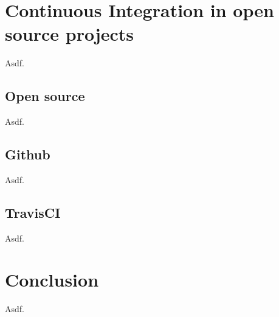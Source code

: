 \chapter{Continuous Integration in open source projects}
Asdf.

\section{Open source}
Asdf.

\section{Github}
Asdf.

\section{TravisCI}
Asdf.

\chapter{Conclusion}
Asdf.


